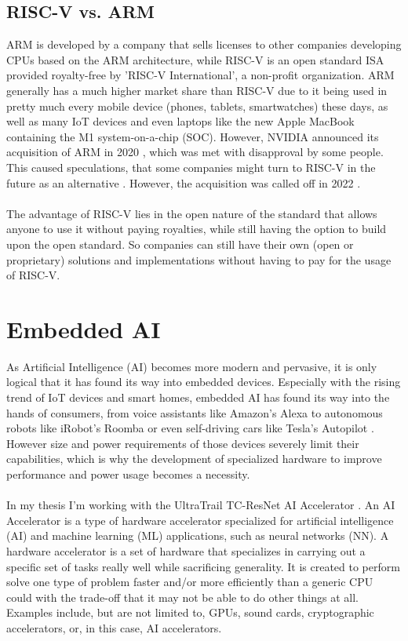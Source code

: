 \subsection{RISC-V vs. ARM}

ARM \cite{arm} is developed by a company that sells licenses to other companies developing CPUs based on the ARM architecture,
while RISC-V \cite{riscv} is an open standard ISA provided royalty-free by 'RISC-V International', a non-profit organization.
ARM generally has a much higher market share than RISC-V due to it being used in pretty much every mobile device (phones, tablets, smartwatches)
these days, as well as many IoT devices and even laptops like the new Apple MacBook containing the M1 system-on-a-chip (SOC).
However, NVIDIA announced its acquisition of ARM in 2020 \cite{arm_sale}, which was met with disapproval by some people.
This caused speculations, that some companies might turn to RISC-V in the future as an alternative \cite{arm_sale_speculation}.
However, the acquisition was called off in 2022 \cite{arm_sale_called_off}.\\\\
The advantage of RISC-V lies in the open nature of the standard that allows anyone to use it without paying royalties, while still
having the option to build upon the open standard.
So companies can still have their own (open or proprietary) solutions and implementations \cite{riscv_about} without having to pay for
the usage of RISC-V.

\section{Embedded AI}

As Artificial Intelligence (AI) becomes more modern and pervasive, it is only logical that it has found its way into embedded devices.
Especially with the rising trend of IoT devices and smart homes, embedded AI has found its way into the hands of consumers,
from voice assistants like Amazon's Alexa \cite{alexa} to autonomous robots like iRobot's Roomba \cite{roomba} or even self-driving cars like Tesla's Autopilot \cite{autopilot}.
However size and power requirements of those devices severely limit their capabilities, which is why the development of specialized hardware to improve performance
and power usage becomes a necessity.\\\\
In my thesis I'm working with the UltraTrail TC-ResNet AI Accelerator \cite{ultratrail}.
An AI Accelerator is a type of hardware accelerator specialized for artificial intelligence (AI) and machine learning (ML) applications, such as neural networks (NN).
A hardware accelerator is a set of hardware that specializes in carrying out a specific set of tasks really well while sacrificing generality.
It is created to perform solve one type of problem faster and/or more efficiently than a generic CPU could with the trade-off that it may not be able to do other things at all.
Examples include, but are not limited to, GPUs, sound cards, cryptographic accelerators, or, in this case, AI accelerators.\\\\


